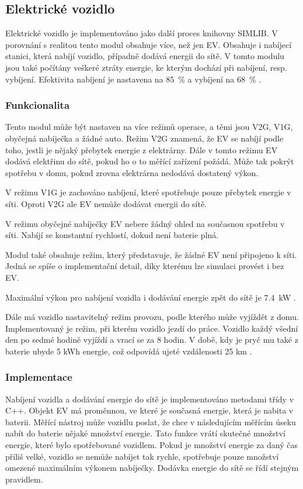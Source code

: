 \documentclass[12pt,a4paper]{article}
\begin{document}
\newpage

\subsection{Elektrické vozidlo}
Elektrické vozidlo je implementováno jako další proces knihovny SIMLIB.
V porovnání s realitou tento modul obsahuje více, než jen EV.
Obsahuje i nabíjecí stanici, která nabíjí vozidlo, případně dodává energii do sítě.
V tomto modulu jsou také počítány veškeré ztráty energie, ke kterým dochází při nabíjení, resp. vybíjení.
Efektivita nabíjení je nastavena na 85~\% a vybíjení na 68~\% \cite{Shirazi-2018}.

\subsubsection{Funkcionalita}
Tento modul může být nastaven na více režimů operace, a těmi jsou V2G, V1G, obyčejná nabíječka a žádné auto.
Režim V2G znamená, že EV se nabíjí podle toho, jestli je nějaký přebytek energie z elektrárny.
Dále v tomto režimu EV dodává elektřinu do sítě, pokud ho o to měřící zařízení požádá.
Může tak pokrýt spotřebu v domu, pokud zrovna elektrárna nedodává dostatený výkon.

V režimu V1G je zachováno nabíjení, které spotřebuje pouze přebytek energie v síti.
Oproti V2G ale EV nemůže dodávat energii do sítě.

V režimu obyčejné nabíječky EV nebere žádný ohled na současnou spotřebu v síti.
Nabíjí se konstantní rychlostí, dokud není baterie plná.

Modul také obsahuje režim, který představuje, že žádné EV není připojeno k síti.
Jedná se spíše o implementační detail, díky kterému lze simulaci provést i bez EV.

Maximální výkon pro nabíjení vozidla i dodávání energie zpět do sítě je 7.4~kW \cite{Svarc-2022}.

Dále má vozidlo nastavitelný režim provozu, podle kterého může vyjíždět z domu.
Implementovaný je režim, při kterém vozidlo jezdí do práce.
Vozidlo každý všední den po sedmé hodině vyjíždí a vrací se za 8 hodin.
V době, kdy je pryč mu také z baterie ubyde 5 kWh energie,
což odpovídá ujeté vzdálenosti 25 km \cite{ev-database-2022}.

\subsubsection{Implementace}
Nabíjení vozidla a dodávání energie do sítě je implementováno metodami třídy v C++.
Objekt EV má proměnnou, ve které je současná energie, která je nabita v baterii.
Měřící nástroj může vozidlu poslat, že chce v následujícím měřícím úseku nabít do baterie nějaké množství energie.
Tato funkce vrátí skutečné množství energie, které bylo spotřebované vozidlem.
Pokud je množství energie za daný čas příliš velké,
vozidlo se nemůže nabíjet tak rychle, spotřebuje pouze množství omezené maximálním výkonem nabíječky.
Dodávka energie do sítě se řídí stejným pravidlem.
\end{document}
